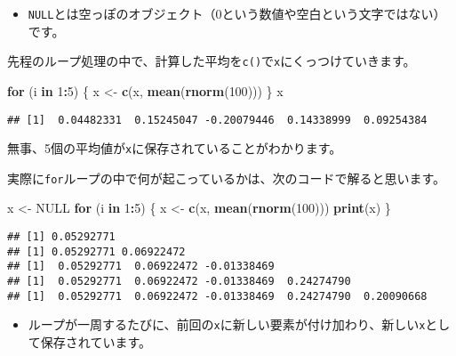 \documentclass[]{bxjsarticle}
\newenvironment{Shaded}{\begin{snugshade}}{\end{snugshade}}
\newcommand{\ControlFlowTok}[1]{\textcolor[rgb]{0.13,0.29,0.53}{\textbf{#1}}}
\newcommand{\DecValTok}[1]{\textcolor[rgb]{0.00,0.00,0.81}{#1}}
\newcommand{\KeywordTok}[1]{\textcolor[rgb]{0.13,0.29,0.53}{\textbf{#1}}}
\newcommand{\NormalTok}[1]{#1}
\newcommand{\OperatorTok}[1]{\textcolor[rgb]{0.81,0.36,0.00}{\textbf{#1}}}
\newcommand{\OtherTok}[1]{\textcolor[rgb]{0.56,0.35,0.01}{#1}}
\newcommand{\StringTok}[1]{\textcolor[rgb]{0.31,0.60,0.02}{#1}}
\providecommand{\tightlist}{%
  \setlength{\itemsep}{0pt}\setlength{\parskip}{0pt}}
\begin{document}
\begin{itemize}
\tightlist
\item
  \texttt{NULL}とは空っぽのオブジェクト（0という数値や空白という文字ではない）です。
\end{itemize}

先程のループ処理の中で、計算した平均を\texttt{c()}で\texttt{x}にくっつけていきます。

\begin{Shaded}
\begin{Highlighting}[]
\ControlFlowTok{for}\NormalTok{ (i }\ControlFlowTok{in} \DecValTok{1}\OperatorTok{:}\DecValTok{5}\NormalTok{) \{}
\NormalTok{  x <-}\StringTok{ }\KeywordTok{c}\NormalTok{(x, }\KeywordTok{mean}\NormalTok{(}\KeywordTok{rnorm}\NormalTok{(}\DecValTok{100}\NormalTok{)))}
\NormalTok{\}}
\NormalTok{x}
\end{Highlighting}
\end{Shaded}

\begin{verbatim}
## [1]  0.04482331  0.15245047 -0.20079446  0.14338999  0.09254384
\end{verbatim}

無事、5個の平均値が\texttt{x}に保存されていることがわかります。

実際に\texttt{for}ループの中で何が起こっているかは、次のコードで解ると思います。

\begin{Shaded}
\begin{Highlighting}[]
\NormalTok{x <-}\StringTok{ }\OtherTok{NULL}
\ControlFlowTok{for}\NormalTok{ (i }\ControlFlowTok{in} \DecValTok{1}\OperatorTok{:}\DecValTok{5}\NormalTok{) \{}
\NormalTok{  x <-}\StringTok{ }\KeywordTok{c}\NormalTok{(x, }\KeywordTok{mean}\NormalTok{(}\KeywordTok{rnorm}\NormalTok{(}\DecValTok{100}\NormalTok{)))}
  \KeywordTok{print}\NormalTok{(x)}
\NormalTok{\}}
\end{Highlighting}
\end{Shaded}

\begin{verbatim}
## [1] 0.05292771
## [1] 0.05292771 0.06922472
## [1]  0.05292771  0.06922472 -0.01338469
## [1]  0.05292771  0.06922472 -0.01338469  0.24274790
## [1]  0.05292771  0.06922472 -0.01338469  0.24274790  0.20090668
\end{verbatim}

\begin{itemize}
\tightlist
\item
  ループが一周するたびに、前回の\texttt{x}に新しい要素が付け加わり、新しい\texttt{x}として保存されています。
\end{itemize}
\end{document}
